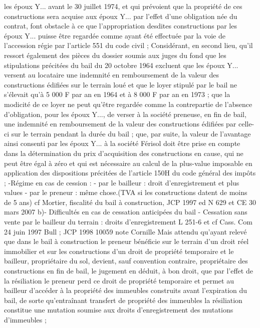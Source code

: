 \documentclass[11pt,a4paper]{report}
\begin{document}
	les époux Y... avant le 30 juillet 1974, et qui prévoient que la propriété de ces constructions sera acquise aux
	époux Y... par l'effet d'une obligation née du contrat, font obstacle à ce que l'appropriation desdites
	constructions par les époux Y... puisse être regardée comme ayant été effectuée par la voie de l'accession régie
	par l'article 551 du code civil ;
	Considérant, en second lieu, qu'il ressort également des pièces du dossier soumis aux juges du fond que les
	stipulations précitées du bail du 20 octobre 1964 excluent que les époux Y... versent au locataire une indemnité
	en remboursement de la valeur des constructions édifiées sur le terrain loué et que le loyer stipulé par le bail ne
	s'élevait qu'à 5 000 F par an en 1964 et à 8 000 F par an en 1973 ; que la modicité de ce loyer ne peut qu'être
	regardée comme la contrepartie de l'absence d'obligation, pour les époux Y..., de verser à la société preneuse,
	en fin de bail, une indemnité en remboursement de la valeur des constructions édifiées par celle-ci sur le terrain
	pendant la durée du bail ; que, par suite, la valeur de l'avantage ainsi consenti par les époux Y... à la société
	Férisol doit être prise en compte dans la détermination du prix d'acquisition des constructions en cause, qui ne
	peut être égal à zéro et qui est nécessaire au calcul de la plus-value imposable en application des dispositions
	précitées de l'article 150H du code général des impôts ;
	-Régime en cas de cession : - par le bailleur : droit d’enregistrement et plus values
	- par le preneur : même chose.(TVA si les constructions datent de moins de 5 ans) cf
	Mortier, fiscalité du bail à construction, JCP 1997 ed N 629 et CE 30 mars 2007
	b)- Difficultés en cas de cessation anticipées du bail
	- Cessation sans vente par le bailleur du terrain : droits d’enregistrement
	L 251-6 et cf Cass. Com 24 juin 1997 Bull ; JCP 1998 10059 note Cornille
	Mais attendu qu'ayant relevé que dans le bail à construction le preneur bénéficie sur le terrain d'un droit réel
	immobilier et sur les constructions d'un droit de propriété temporaire et le bailleur, propriétaire du sol, devient,
	sauf convention contraire, propriétaire des constructions en fin de bail, le jugement en déduit, à bon droit, que
	par l'effet de la résiliation le preneur perd ce droit de propriété temporaire et permet au bailleur d'accéder à la
	propriété des immeubles construits avant l'expiration du bail, de sorte qu'entraînant transfert de propriété des
	immeubles la résiliation constitue une mutation soumise aux droits d'enregistrement des mutations d'immeubles ;
\end{document}
